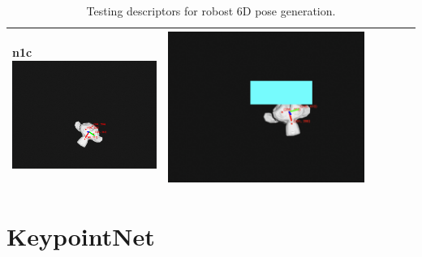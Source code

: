 \begin{table}[htb]
\begin{tabular}{lccccc}
n{1}{c}{\includegraphics[scale=0.15]{images/don/illum.png}} & \multicolumn{1}{c}{\includegraphics[scale=0.0915]{images/don/occlusion.png}} \\ \hline
    \end{tabular}
    \caption{Testing descriptors for robost 6D pose generation.}
    \label{table:robust_descriptors}
\end{table}








\section{KeypointNet}
\label{subsection:KeypointNet}

